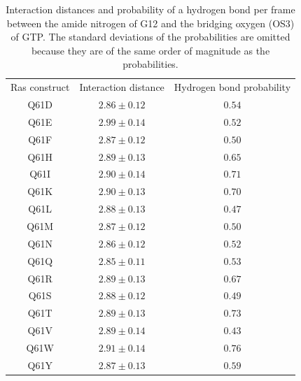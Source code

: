 \begin{table}
    \caption{Interaction distances and probability of a hydrogen bond per frame between the amide nitrogen of G12 and the bridging oxygen (OS3) of GTP. The standard deviations of the probabilities are omitted because they are of the same order of magnitude as the probabilities.}
    \begin{center}
    \begin{tabular}{ccc}
    \toprule
   \rowcolor{lgray}
    Ras construct & Interaction distance & Hydrogen bond probability\\
    \cmidrule(r){1-1}\cmidrule(rl){2-2}\cmidrule(l){3-3}
Q61D  & $2.86 \pm   0.12$ &   $0.54 $\\%
Q61E  & $2.99 \pm   0.14$ &   $0.52 $\\%
Q61F  & $2.87 \pm   0.12$ &   $0.50 $\\%
Q61H  & $2.89 \pm   0.13$ &   $0.65 $\\%
Q61I  & $2.90 \pm   0.14$ &   $0.71 $\\%
Q61K  & $2.90 \pm   0.13$ &   $0.70 $\\%
Q61L  & $2.88 \pm   0.13$ &   $0.47 $\\%
Q61M  & $2.87 \pm   0.12$ &   $0.50 $\\%
Q61N  & $2.86 \pm   0.12$ &   $0.52 $\\%
Q61Q  & $2.85 \pm   0.11$ &   $0.53 $\\%
Q61R  & $2.89 \pm   0.13$ &   $0.67 $\\%
Q61S  & $2.88 \pm   0.12$ &   $0.49 $\\%
Q61T  & $2.89 \pm   0.13$ &   $0.73 $\\%
Q61V  & $2.89 \pm   0.14$ &   $0.43 $\\%
Q61W  & $2.91 \pm   0.14$ &   $0.76 $\\%
Q61Y  & $2.87 \pm   0.13$ &   $0.59 $\\%

\bottomrule
\end{tabular}
    \end{center}
    \label{tbl:ras-g12}
\end{table}

